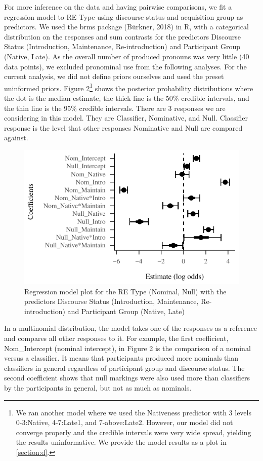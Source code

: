 \documentclass[]{elsarticle} %
\begin{document}
For more inference on the data and having pairwise comparisons, we fit a
regression model to RE Type using discourse status and acquisition group
as predictors. We used the brms package (Bürkner, 2018) in R, with a
categorical distribution on the responses and sum contrasts for the
predictors Discourse Status (Introduction, Maintenance, Re-introduction)
and Participant Group (Native, Late). As the overall number of produced
pronouns was very little (40 data points), we excluded pronominal use
from the following analyses. For the current analysis, we did not define
priors ourselves and used the preset uninformed priors. Figure
2\footnote{We ran another model where we used the Nativeness predictor
  with 3 levels 0-3:Native, 4-7:Late1, and 7-above:Late2. However, our
  model did not converge properly and the credible intervals were very
  wide spread, yielding the results uninformative. We provide the model
  results as a plot in \ref{section:d}.} shows the posterior probability
distributions where the dot is the median estimate, the thick line is
the 50\% credible intervals, and the thin line is the 95\% credible
intervals. There are 3 responses we are considering in this model. They
are Classifier, Nominative, and Null. Classifier response is the level
that other responses Nominative and Null are compared against.

\begin{figure}
\centering
\includegraphics{revised_manuscript_files/figure-latex/model-gram-1.pdf}
\caption{Regression model plot for the RE Type (Nominal, Null) with the
predictors Discourse Status (Introduction, Maintenance, Re-introduction)
and Participant Group (Native, Late)}
\end{figure}

In a multinomial distribution, the model takes one of the responses as a
reference and compares all other responses to it. For example, the first
coefficient, Nom\_Intercept (nominal intercept), in Figure 2 is the
comparison of a nominal versus a classifier. It means that participants
produced more nominals than classifiers in general regardless of
participant group and discourse status. The second coefficient shows
that null markings were also used more than classifiers by the
participants in general, but not as much as nominals.
\end{document}
